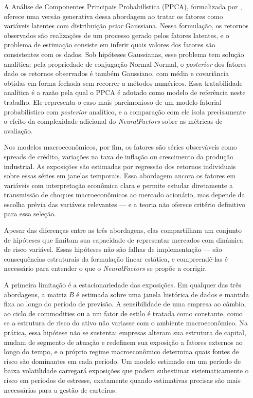 A Análise de Componentes Principais Probabilística (PPCA), formalizada por \textcite{tipping1999}, oferece uma versão generativa dessa abordagem ao tratar os fatores como variáveis latentes com distribuição \textit{prior} Gaussiana. Nessa formulação, os retornos observados são realizações de um processo gerado pelos fatores latentes, e o problema de estimação consiste em inferir quais valores dos fatores são consistentes com os dados. Sob hipóteses Gaussianas, esse problema tem solução analítica: pela propriedade de conjugação Normal-Normal, o \textit{posterior} dos fatores dado os retornos observados é também Gaussiano, com média e covariância obtidas em forma fechada sem recorrer a métodos numéricos. Essa tratabilidade analítica é a razão pela qual o PPCA é adotado como modelo de referência neste trabalho. Ele representa o caso mais parcimonioso de um modelo fatorial probabilístico com \textit{posterior} analítico, e a comparação com ele isola precisamente o efeito da complexidade adicional do \textit{NeuralFactors} sobre as métricas de avaliação.
 
Nos modelos macroeconômicos, por fim, os fatores são séries observáveis como spreads de crédito, variações na taxa de inflação ou crescimento da produção industrial. As exposições são estimadas por regressão dos retornos individuais sobre essas séries em janelas temporais. Essa abordagem ancora os fatores em variáveis com interpretação econômica clara e permite estudar diretamente a transmissão de choques macroeconômicos ao mercado acionário, mas depende da escolha prévia das variáveis relevantes — e a teoria não oferece critério definitivo para essa seleção.
 
Apesar das diferenças entre as três abordagens, elas compartilham um conjunto de hipóteses que limitam sua capacidade de representar mercados com dinâmica de risco variável. Essas hipóteses não são falhas de implementação — são consequências estruturais da formulação linear estática, e compreendê-las é necessário para entender o que o \textit{NeuralFactors} se propõe a corrigir.
 
A primeira limitação é a estacionariedade das exposições. Em qualquer das três abordagens, a matriz $B$ é estimada sobre uma janela histórica de dados e mantida fixa ao longo do período de previsão. A sensibilidade de uma empresa ao câmbio, ao ciclo de commodities ou a um fator de estilo é tratada como constante, como se a estrutura de risco do ativo não variasse com o ambiente macroeconômico. Na prática, essa hipótese não se sustenta: empresas alteram sua estrutura de capital, mudam de segmento de atuação e redefinem sua exposição a fatores externos ao longo do tempo, e o próprio regime macroeconômico determina quais fontes de risco são dominantes em cada período. Um modelo estimado em um período de baixa volatilidade carregará exposições que podem subestimar sistematicamente o risco em períodos de estresse, exatamente quando estimativas precisas são mais necessárias para a gestão de carteiras.
 
